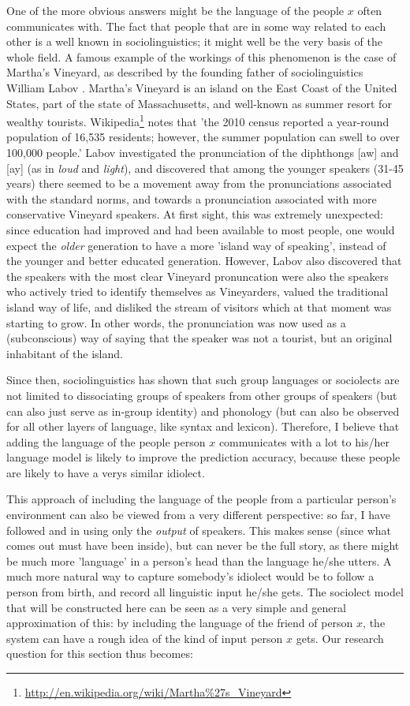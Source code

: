 \documentclass[12pt]{article}
\begin{document}
One of the more obvious answers might be the language of the people $x$ often communicates with. The fact that people that are in some way related to each other is a well known in sociolinguistics; it might well be the very basis of the whole field. A famous example of the workings of this phenomenon is the case of Martha's Vineyard, as described by the founding father of sociolinguistics William Labov \cite{labov63}. Martha's Vineyard is an island on the East Coast of the United States, part of the state of Massachusetts, and well-known as summer resort for wealthy tourists. Wikipedia\footnote{\url{http://en.wikipedia.org/wiki/Martha\%27s\_Vineyard}} notes that 'the 2010 census reported a year-round population of 16,535 residents; however, the summer population can swell to over 100,000 people.' Labov investigated the pronunciation of the diphthongs [aw] and [ay] (as in \emph{loud} and \emph{light}), and discovered that among the younger speakers (31-45 years) there seemed to be a movement away from the pronunciations associated with the standard norms, and towards a pronunciation associated with more conservative  Vineyard speakers. At first sight, this was extremely unexpected: since education had improved and had been available to most people, one would expect the \emph{older} generation to have a more 'island way of speaking', instead of the younger and better educated generation. However, Labov also discovered that the speakers with the most clear Vineyard pronuncation were also the speakers who actively tried to identify themselves as Vineyarders, valued the traditional island way of life, and disliked the stream of visitors which at that moment was starting to grow. In other words, the pronunciation was now used as a (subconscious) way of saying that the speaker was not a tourist, but an original inhabitant of the island.

Since then, sociolinguistics has shown that such group languages or sociolects are not limited to dissociating groups of speakers from other groups of speakers (but can also just serve as in-group identity) and phonology (but can also be observed for all other layers of language, like syntax and lexicon). Therefore, I believe that adding the language of the people person $x$ communicates with a lot to his/her language model is likely to improve the prediction accuracy, because these people are likely to have a verys similar idiolect.

This approach of including the language of the people from a particular person's environment can also be viewed from a very different perspective: so far, I have followed  and  in using only the \emph{output} of speakers. This makes sense (since what comes out must have been inside), but can never be the full story, as there might be much more 'language' in a person's head than the language he/she utters. A much more natural way to capture somebody's idiolect would be to follow a person from birth, and record all linguistic input he/she gets. The sociolect model that will be constructed here can be seen as a very simple and general approximation of this: by including the language of the friend of person $x$, the system can have a rough idea of the kind of input person $x$ gets. Our research question for this section thus becomes:
\end{document}

